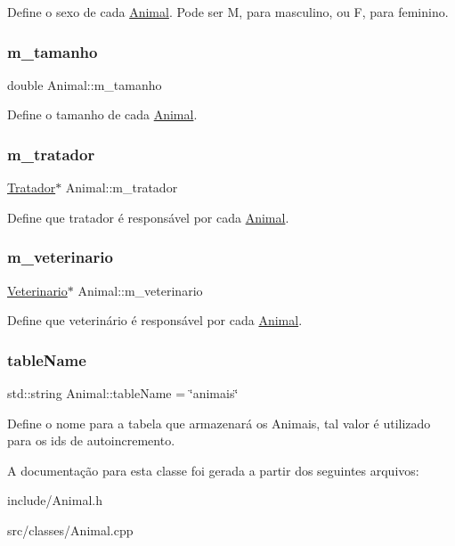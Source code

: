 Define o sexo de cada \hyperlink{classAnimal}{Animal}. Pode ser M, para masculino, ou F, para feminino. \mbox{\label{classAnimal_afe83ba40e79b42d06b0c95f61aaa0218}} 
\subsubsection{\texorpdfstring{m\+\_\+tamanho}{m\_tamanho}}
{\footnotesize\ttfamily double Animal\+::m\+\_\+tamanho\hspace{0.3cm}{\ttfamily [protected]}}

Define o tamanho de cada \hyperlink{classAnimal}{Animal}. \mbox{\label{classAnimal_a1d9b76d126f6d72374f94d4d359e0ea7}} 
\subsubsection{\texorpdfstring{m\+\_\+tratador}{m\_tratador}}
{\footnotesize\ttfamily \hyperlink{classTratador}{Tratador}$\ast$ Animal\+::m\+\_\+tratador\hspace{0.3cm}{\ttfamily [protected]}}

Define que tratador é responsável por cada \hyperlink{classAnimal}{Animal}. \mbox{\label{classAnimal_a3b95df9484483642a10cafcafc15961d}} 
\subsubsection{\texorpdfstring{m\+\_\+veterinario}{m\_veterinario}}
{\footnotesize\ttfamily \hyperlink{classVeterinario}{Veterinario}$\ast$ Animal\+::m\+\_\+veterinario\hspace{0.3cm}{\ttfamily [protected]}}

Define que veterinário é responsável por cada \hyperlink{classAnimal}{Animal}. \mbox{\label{classAnimal_a09d2d66762ed1fea5c6858d092b6ccb9}} 
\subsubsection{\texorpdfstring{table\+Name}{tableName}}
{\footnotesize\ttfamily std\+::string Animal\+::table\+Name = \char`\"{}animais\char`\"{}\hspace{0.3cm}{\ttfamily [static]}}

Define o nome para a tabela que armazenará os Animais, tal valor é utilizado para os ids de autoincremento. 

A documentação para esta classe foi gerada a partir dos seguintes arquivos\+:\begin{DoxyCompactItemize}
\item 
include/Animal.\+h\item 
src/classes/Animal.\+cpp\end{DoxyCompactItemize}
